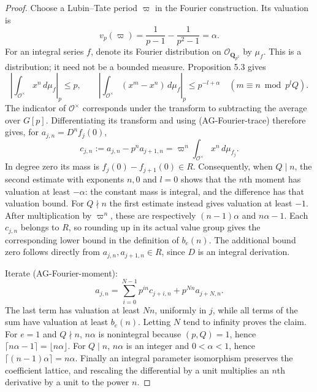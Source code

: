 \begin{proof}
Choose a Lubin--Tate period $\varpi$ in the Fourier construction.  Its
valuation is
\[
 v_p(\varpi)=\frac1{p-1}-\frac1{p^2-1}=\alpha.
\]
For an integral series $f$, denote its Fourier distribution on
$\mathcal O_{\mathbf Q_{p^2}}$ by $\mu_f$.  This is a distribution;
it need not be a bounded measure.  Proposition 5.3 gives
\[
 \left|\int_{\mathcal O^\times}x^n\,d\mu_f\right|_p\leq p,
 \qquad
 \left|\int_{\mathcal O^\times}(x^m-x^n)\,d\mu_f\right|_p
       \leq p^{-l+\alpha}
 \quad(m\equiv n\bmod p^lQ).                              \tag{AG-Fourier-est}
\]
The indicator of $\mathcal O^\times$ corresponds under the transform to
subtracting the average over $G[p]$.  Differentiating its transform and
using (AG-Fourier-trace) therefore gives, for $a_{j,n}=D^nf_j(0)$,
\[
 c_{j,n}:=a_{j,n}-p^n a_{j+1,n}
       =\varpi^n\int_{\mathcal O^\times}x^n\,d\mu_{f_j}.    \tag{AG-Fourier-moment}
\]
In degree zero its mass is $f_j(0)-f_{j+1}(0)\in R$.  Consequently,
when $Q\mid n$, the second estimate with exponents $n,0$ and $l=0$
shows that the $n$th moment has valuation at least $-\alpha$:
the constant mass is integral, and the difference has that valuation
bound.  For $Q\nmid n$ the first estimate instead gives valuation
at least $-1$.  After multiplication by $\varpi^n$, these are respectively
$(n-1)\alpha$ and $n\alpha-1$.  Each $c_{j,n}$ belongs to $R$, so rounding
up in its actual value group gives the corresponding lower bound in the
definition of $b_e(n)$.  The additional bound zero follows directly from
$a_{j,n},a_{j+1,n}\in R$, since $D$ is an integral derivation.

Iterate (AG-Fourier-moment):
\[
 a_{j,n}=\sum_{i=0}^{N-1}p^{in}c_{j+i,n}+p^{Nn}a_{j+N,n}.
\]
The last term has valuation at least $Nn$, uniformly in $j$, while all
terms of the sum have valuation at least $b_e(n)$.  Letting $N$ tend to
infinity proves the claim.  For $e=1$ and $Q\nmid n$, $n\alpha$ is
nonintegral because $(p,Q)=1$, hence $\lceil n\alpha-1\rceil
=\lfloor n\alpha\rfloor$.  For $Q\mid n$, $n\alpha$ is an integer
and $0<\alpha<1$, hence $\lceil(n-1)\alpha\rceil=n\alpha$.
Finally an integral parameter isomorphism preserves the coefficient
lattice, and rescaling the differential by a unit multiplies an $n$th
derivative by a unit to the power $n$.
\end{proof}

